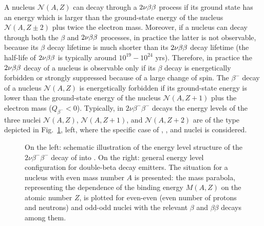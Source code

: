 A nucleus $\mathcal{N}(A,Z)$ can decay through a $2\nu\beta\beta$ process if its ground state has an energy which is larger than the ground-state energy of the nucleus $\mathcal{N}(A,Z\pm2)$ plus twice the electron mass. Moreover, if a nucleus can decay through both the $\beta$ and $2\nu\beta\beta$ processes, in practice the latter is not observable, because its $\beta$ decay lifetime is much shorter than its $2\nu\beta\beta$ decay lifetime (the half-life of $2\nu\beta\beta$ is typically around $10^{19}-10^{24}$ yrs). Therefore, in practice the $2\nu\beta\beta$ decay of a nucleus is observable only if its $\beta$ decay is energetically forbidden or strongly suppressed because of a large change of spin. The $\beta^-$ decay of a nucleus $\mathcal{N}(A,Z)$ is energetically forbidden if its ground-state energy is lower than the ground-state energy of the nucleus $\mathcal{N}(A,Z+1)$ plus the electron mass ($Q_{\beta^{-}}<0$). Typically, in $2\nu\beta^-\beta^-$ decays the energy levels of the three nuclei $\mathcal{N}(A,Z)$, $\mathcal{N}(A,Z+1)$, and $\mathcal{N}(A,Z+2)$ are of the type depicted in Fig.~\ref{fig:levelsGe76}, left, where the specific case of , , and  nuclei is considered.
\begin{figure}
	\centering
	\caption{On the left: schematic illustration of the energy level structure of the $2\nu\beta^-\beta^-$ decay of  into . On the right: general energy level configuration for double-beta decay emitters. The situation for a nucleus with even mass number $A$ is presented: the mass parabola, representing the dependence of the binding energy $M(A,Z)$ on the atomic number $Z$, is plotted for even-even (even number of protons and neutrons) and odd-odd nuclei with the relevant $\beta$ and $\beta\beta$ decays among them.}
	\label{fig:levelsGe76}
\end{figure}

